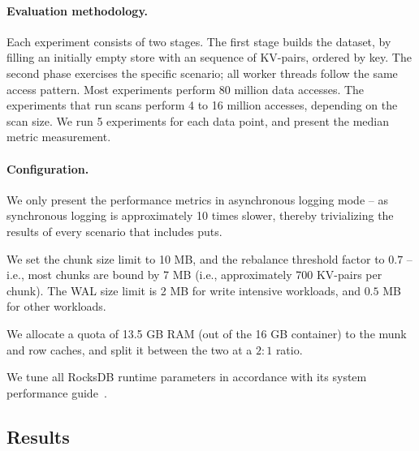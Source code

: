 \paragraph{Evaluation methodology.} Each experiment consists of two stages. The first stage builds 
the dataset, by filling an initially empty store with an sequence of KV-pairs, ordered by key. The second 
phase exercises the specific scenario; all worker threads follow the same access pattern. Most experiments 
perform 80 million data accesses. The experiments that run scans perform 4 to 16 million accesses, depending 
on the scan size. We run 5 experiments for each data point, and present the median metric measurement. 

\paragraph{Configuration.} 
We only present the performance metrics in asynchronous logging mode -- as synchronous logging 
is approximately 10 times slower, thereby trivializing the results of every scenario that includes puts. 

We set the \sys\/ chunk size limit to 10 MB, and the rebalance threshold factor to $0.7$ -- i.e., 
most chunks are bound by 7 MB (i.e., approximately 700 KV-pairs per chunk). The WAL size limit
is 2 MB for write intensive workloads, and $0.5$ MB for other workloads. 

We allocate a quota of 13.5 GB RAM (out of the 16 GB container) to the munk and row caches, 
and split it between the two at a $2:1$ ratio. 

We tune all RocksDB runtime parameters in accordance with its system performance guide~\cite{RocksDBPerf}.   

\subsection{Results}

